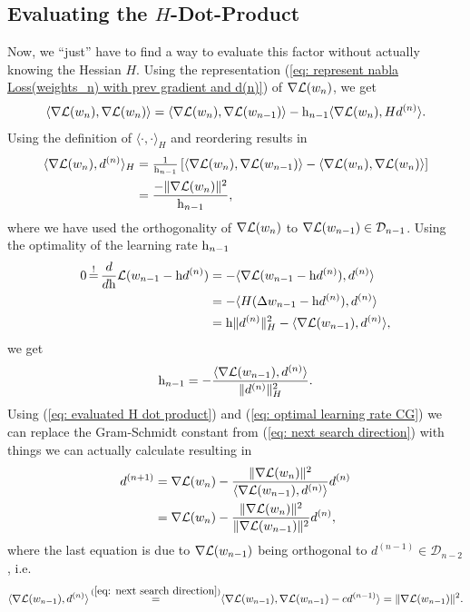 \subsection{Evaluating the \(H\)-Dot-Product}

Now, we ``just'' have to find a way to evaluate this factor without actually
knowing the Hessian \(H\). Using the representation (\ref{eq: represent nabla Loss(weights_n) with
prev gradient and d(n)}) of \(\nabla\mathcal{L}(w_n)\), we get
\begin{align*}
	\langle \nabla\mathcal{L}(w_n), \nabla\mathcal{L}(w_n) \rangle
	= \langle \nabla\mathcal{L}(w_n), \nabla\mathcal{L}(w_{n-1}) \rangle
	- \text{h}_{n-1}\langle \nabla\mathcal{L}(w_n), H d^{(n)}\rangle.
\end{align*}
Using the definition of \(\langle\cdot,\cdot\rangle_H\) and reordering results in
\begin{align}
	\nonumber
	\langle \nabla\mathcal{L}(w_n), d^{(n)}\rangle_H
	&= \tfrac1{\text{h}_{n-1}}\left[
		\langle \nabla\mathcal{L}(w_n), \nabla\mathcal{L}(w_{n-1}) \rangle
		- \langle \nabla\mathcal{L}(w_n), \nabla\mathcal{L}(w_n) \rangle
	\right]\\
	\label{eq: evaluated H dot product}
	&= \frac{- \|\nabla\mathcal{L}(w_n)\|^2}{\text{h}_{n-1}},
\end{align}
where we have used the orthogonality of \(\nabla\mathcal{L}(w_n)\) to
\(\nabla\mathcal{L}(w_{n-1})\in\mathcal{D}_{n-1}\).
Using the optimality of the learning rate \(\text{h}_{n-1}\)
\begin{align*}
	0\xeq{!}\frac{d}{d\lr}\Loss(\weights_{n-1} - \lr d^{(n)})
	&= -\langle \nabla\Loss(\weights_{n-1} - \lr d^{(n)}), d^{(n)} \rangle\\
	&= -\langle H(\Delta\weights_{n-1} -\lr d^{(n)}), d^{(n)} \rangle\\
	&= \lr\|d^{(n)}\|_H^2 - \langle \nabla\Loss(\weights_{n-1}), d^{(n)}\rangle,
\end{align*}
we get
\begin{align}\label{eq: optimal learning rate CG}
	\text{h}_{n-1}
	= - \frac{\langle \nabla\mathcal{L}(w_{n-1}), d^{(n)}\rangle}{\|d^{(n)}\|_H^2}.
\end{align}
Using (\ref{eq: evaluated H dot product}) and (\ref{eq: optimal learning rate CG})
we can replace the Gram-Schmidt constant from (\ref{eq: next search direction})
with things we can actually calculate resulting in
\begin{align*}
	d^{(n+1)}
	&= \nabla\mathcal{L}(w_n)
	- \frac{
		\|\nabla\mathcal{L}(w_n)\|^2
	}{\langle \nabla\mathcal{L}(w_{n-1}), d^{(n)}\rangle}d^{(n)}\\
	&= \nabla\mathcal{L}(w_n)
	- \frac{\|\nabla\mathcal{L}(w_n)\|^2}{\|\nabla\mathcal{L}(w_{n-1})\|^2}
	d^{(n)},
\end{align*}
where the last equation is due to \(\nabla\mathcal{L}(w_{n-1})\) being orthogonal
to \(d^{(n-1)}\in\mathcal{D}_{n-2}\), i.e.
\begin{align*}
	\langle \nabla\Loss(\weights_{n-1}), d^{(n)} \rangle
	\xeq{(\ref{eq: next search direction})} 
	\langle \nabla\Loss(\weights_{n-1}),\nabla\Loss(\weights_{n-1}) - c d^{(n-1)}\rangle
	= \|\nabla\Loss(\weights_{n-1})\|^2.
\end{align*}

